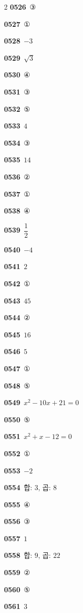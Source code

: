 \documentclass[10pt,a4paper]{article}
\begin{document}
\begin{multicols}{2}
\noindent\textbf{0526}\ ③\par
\noindent\textbf{0527}\ ①\par
\noindent\textbf{0528}\ $-3$\par
\noindent\textbf{0529}\ $\sqrt{3}$\par
\noindent\textbf{0530}\ ④\par
\noindent\textbf{0531}\ ③\par
\noindent\textbf{0532}\ ⑤\par
\noindent\textbf{0533}\ $4$\par
\noindent\textbf{0534}\ ③\par
\noindent\textbf{0535}\ $14$\par
\noindent\textbf{0536}\ ②\par
\noindent\textbf{0537}\ ①\par
\noindent\textbf{0538}\ ④\par
\noindent\textbf{0539}\ $\dfrac{1}{2}$\par
\noindent\textbf{0540}\ $-4$\par
\noindent\textbf{0541}\ $2$\par
\noindent\textbf{0542}\ ①\par
\noindent\textbf{0543}\ $45$\par
\noindent\textbf{0544}\ ②\par
\noindent\textbf{0545}\ $16$\par
\noindent\textbf{0546}\ $5$\par
\noindent\textbf{0547}\ ①\par
\noindent\textbf{0548}\ ⑤\par
\noindent\textbf{0549}\ $x^2-10x+21=0$\par
\noindent\textbf{0550}\ ⑤\par
\noindent\textbf{0551}\ $x^2+x-12=0$\par
\noindent\textbf{0552}\ ①\par
\noindent\textbf{0553}\ $-2$\par
\noindent\textbf{0554}\ 합: $3$, 곱: $8$\par
\noindent\textbf{0555}\ ④\par
\noindent\textbf{0556}\ ③\par
\noindent\textbf{0557}\ $1$\par
\noindent\textbf{0558}\ 합: $9$, 곱: $22$\par
\noindent\textbf{0559}\ ②\par
\noindent\textbf{0560}\ ⑤\par
\noindent\textbf{0561}\ $3$\par

\end{multicols}
\end{document}
